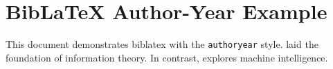 \documentclass[11pt]{article}
\begin{document}
\section*{BibLaTeX Author-Year Example}

This document demonstrates biblatex with the \texttt{authoryear} style.
\textcite{shannon1948} laid the foundation of information theory.
In contrast, \parencite{turing1950} explores machine intelligence.

\printbibliography
\end{document}
